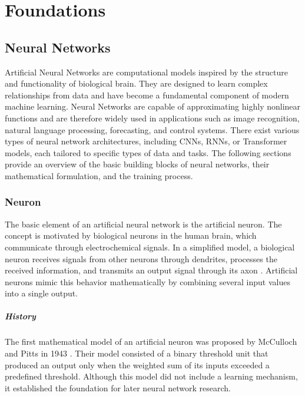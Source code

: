 \chapter{Foundations}



\section{Neural Networks}
Artificial Neural Networks are computational models inspired by the structure and functionality of biological brain. They are designed to learn complex relationships from data and have become a fundamental component of modern machine learning. Neural Networks are capable of approximating highly nonlinear functions and are therefore widely used in applications such as image recognition, natural language processing, forecasting, and control systems. There exist various types of neural network architectures, including \acfp{CNN}, \acfp{RNN}, or Transformer models, each tailored to specific types of data and tasks. The following sections provide an overview of the basic building blocks of neural networks, their mathematical formulation, and the training process.


\subsection{Neuron}
The basic element of an artificial neural network is the artificial neuron. The concept is motivated by biological neurons in the human brain, which communicate through electrochemical signals. In a simplified model, a biological neuron receives signals from other neurons through dendrites, processes the received information, and transmits an output signal through its axon \cite{Lin2017ArtificialNN}. Artificial neurons mimic this behavior mathematically by combining several input values into a single output.

\paragraph{History}
The first mathematical model of an artificial neuron was proposed by McCulloch and Pitts in 1943 \cite{McCulloch1990ALC}. Their model consisted of a binary threshold unit that produced an output only when the weighted sum of its inputs exceeded a predefined threshold. Although this model did not include a learning mechanism, it established the foundation for later neural network research.

